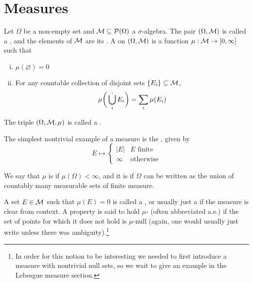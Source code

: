 \documentclass{article}
\begin{document}

\section{Measures}
Let $\Omega$ be a non-empty set and $\mathcal{M} \subseteq \mathcal{P}(\Omega)$ a $\sigma$-algebra.
The pair $(\Omega, \mathcal{M})$ is called a , and the elements of $\mathcal{M}$ are its .
A  on $(\Omega, \mathcal{M})$ is a function $\mu : \mathcal{M} \to [0,\infty]$ such that
\begin{enumerate}[(i)]
\item $\mu(\varnothing) = 0$
\item For any countable collection of disjoint sets $\{E_i\} \subseteq \mathcal{M}$,
\[\mu\bigg(\mathop{\dot{\bigcup}}_i E_i\bigg) = \sum_i \mu(E_i)\]
\end{enumerate}
The triple $(\Omega, \mathcal{M}, \mu)$ is called a .

The simplest nontrivial example of a measure is the , given by
\[E \mapsto \begin{cases}
|E| & \text{$E$ finite} \\
\infty & \text{otherwise}
\end{cases}\]

We say that $\mu$ is  if $\mu(\Omega) < \infty$, and it is  if $\Omega$ can be written as the union of countably many measurable sets of finite measure.

A set $E \in \mathcal{M}$ such that $\mu(E) = 0$ is called a , or usually just a  if the measure is clear from context.
A property is said to hold $\mu$- (often abbreviated a.e.) if the set of points for which it does not hold is $\mu$-null (again, one would usually just write  unless there was ambiguity).\footnote{
    In order for this notion to be interesting we needed to first introduce a measure with nontrivial null sets, so we wait to give an example in the Lebesgue measure section.
}
\end{document}
